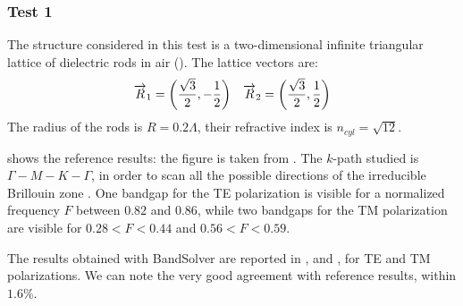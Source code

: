 \subsubsection{Test 1}

The structure considered in this test is a two-dimensional infinite
triangular lattice of dielectric rods in air
(). The lattice vectors are:
\begin{align*}
  \overrightarrow{R}_1 = \left( \frac{\sqrt{3}}{2}, -\frac{1}{2} \right) &&
  \overrightarrow{R}_2 = \left( \frac{\sqrt{3}}{2}, \frac{1}{2} \right)
\end{align*}
The radius of the rods is $R = 0.2 \Lambda$, their refractive index is
$n_{cyl} = \sqrt{12}$.

 shows the reference results: the figure is
taken from \cite{mpb}. The $k$-path studied is $\Gamma-M-K-\Gamma$, in
order to scan all the possible directions of the irreducible Brillouin
zone \cite{kittel_solid}. One bandgap for the TE polarization is visible for a normalized
frequency $F$ between $0.82$ and $0.86$, while two bandgaps for the TM
polarization are visible for $0.28 < F < 0.44$ and $0.56 < F < 0.59$.

The results obtained with BandSolver are reported in
,  and
, for TE and TM polarizations. We can note the
very good agreement with reference results, within $1.6\%$.

